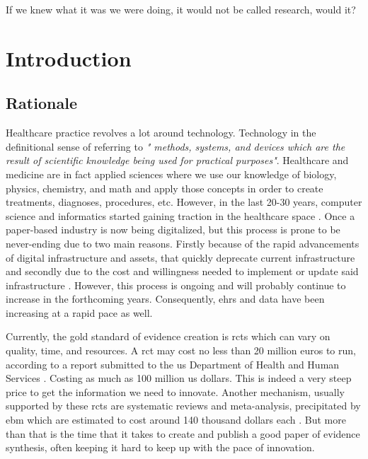 \begin{savequote}[75mm]
If we knew what it was we were doing, it would not be called research, would it?
\end{savequote}
\chapter{Introduction} \label{chap:intro}

\section{Rationale}
Healthcare practice revolves a lot around technology. Technology in the definitional sense of referring to \textit{" methods, systems, and devices which are the result of scientific knowledge being used for practical purposes"}. Healthcare and medicine are in fact applied sciences where we use our knowledge of biology, physics, chemistry, and math and apply those concepts in order to create treatments, diagnoses, procedures, etc.
However, in the last 20-30 years, computer science and informatics started gaining traction in the healthcare space \cite{adler-milsteinHITECHActDrove2017}. Once a paper-based industry is now being digitalized, but this process is prone to be never-ending  \cite{abul-husnPersonalizedMedicinePower2019} due to two main reasons. Firstly because of the rapid advancements of digital infrastructure and assets, that quickly deprecate current infrastructure and secondly due to the cost and willingness needed to implement or update said infrastructure \cite{kruseUseElectronicHealth2018,palabindalaAdoptionElectronicHealth2016}. However, this process is ongoing and will probably continue to increase in the forthcoming years. Consequently, \acp{ehr} and data have been increasing at a rapid pace as well.

Currently, the gold standard of evidence creation is \acp{rct} which can vary on quality, time, and resources. A \ac{rct} may cost no less than 20 million euros to run, according to a report submitted to the \ac{us} Department of Health and Human Services \cite{sertkayaaylinEXAMINATIONCLINICALTRIAL2014}. Costing as much as 100 million \ac{us} dollars. This is indeed a very steep price to get the information we need to innovate.
Another mechanism, usually supported by these \acp{rct} are systematic reviews and meta-analysis, precipitated by \ac{ebm} which are estimated to cost around 140 thousand dollars each \cite{michelsonSignificantCostSystematic2019}. But more than that is the time that it takes to create and publish a good paper of evidence synthesis, often keeping it hard to keep up with the pace of innovation.

